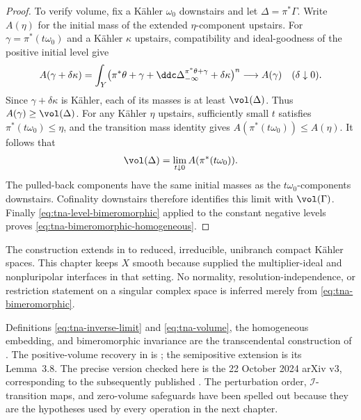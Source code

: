 \begin{proof}
To verify volume, fix a K\"ahler $\omega_0$ downstairs and let
$\Delta=\pi^*\Gamma$.
Write $A(\eta)$ for the initial mass of the extended $\eta$-component
upstairs.  For $\gamma=\pi^*(t\omega_0)$ and a K\"ahler $\kappa$
upstairs, compatibility and ideal-goodness of the positive initial
level give
\[
 A(\gamma+\delta\kappa)
 =\int_Y\bigl(\pi^*\theta+\gamma+
        \ddc\Delta_{-\infty}^{\pi^*\theta+\gamma}
        +\delta\kappa\bigr)^n
 \longrightarrow A(\gamma)
 \quad(\delta\downarrow0).
\]
Since $\gamma+\delta\kappa$ is K\"ahler, each of its masses is at
least $\vol(\Delta)$.  Thus $A(\gamma)\geq\vol(\Delta)$.
For any K\"ahler $\eta$ upstairs, sufficiently small $t$ satisfies
$\pi^*(t\omega_0)\leq\eta$, and the transition mass identity gives
$A(\pi^*(t\omega_0))\leq A(\eta)$.
It follows that
\[
 \vol(\Delta)
 =\lim_{t\downarrow0}A(\pi^*(t\omega_0)).
\]
The pulled-back components have the same initial masses as the
$t\omega_0$-components downstairs.  Cofinality downstairs therefore
identifies this limit with $\vol(\Gamma)$.
Finally \eqref{eq:tna-level-bimeromorphic} applied to the constant
negative levels proves \eqref{eq:tna-bimeromorphic-homogeneous}.
\end{proof}

\begin{remark}
\label{rem:tna-smooth-scope}
The construction extends in \cite{Xia23Operations} to reduced,
irreducible, unibranch compact K\"ahler spaces.  This chapter keeps $X$
smooth because  supplied the
multiplier-ideal and nonpluripolar interfaces in that setting.
No normality, resolution-independence, or restriction statement on a
singular complex space is inferred merely from
\eqref{eq:tna-bimeromorphic}.
\end{remark}

\begin{remark}
\label{rem:tna-source-note}
Definitions \eqref{eq:tna-inverse-limit} and
\eqref{eq:tna-volume}, the homogeneous embedding, and bimeromorphic
invariance are the transcendental construction of \cite{DXZ23}.  The
positive-volume recovery in
 is
\cite[Lemma~3.10]{XiaOperationsV3}; the semipositive extension is
its Lemma~3.8.  The precise version checked here is the 22 October 2024
arXiv v3, corresponding to the subsequently published
\cite{Xia23Operations}.  The perturbation order,
$\mathcal I$-transition maps, and zero-volume safeguards have been
spelled out because they are the hypotheses used by every operation in
the next chapter.
\end{remark}
